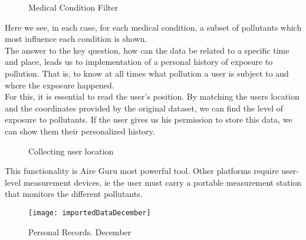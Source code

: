 \begin{figure}[ht]
  \centering
  \hfill
  \hfill
  \caption{Medical Condition Filter}
\end{figure}

Here we see, in each case, for each medical condition, a subset of pollutants which most influence each condition is shown.\\
  
The answer to the key question, how can the data be related to a specific time and place, leads us to
implementation of a personal history of exposure to pollution. That is, to know at all times what pollution
a user is subject to and where the exposure happened.\\

For this, it is essential to read the user's position. By matching the users location and the coordinates provided by the original dataset, we can find the level of exposure to pollutants.
If the user gives us his permission to store this data, we can show them their personalized history.

\begin{figure}[ht]
  \centering 
    \caption{Collecting user location}
  \end{figure}

  This functionality is Aire Guru most powerful tool. Other platforms require user-level measurement devices, ie the user must carry
  a portable measurement station that monitors the different pollutants. \\

  \newpage
  \begin{figure}[ht]
      \centering
      \texttt{[image: importedDataDecember]}
      \caption{Personal Records. December}
  \end{figure}

